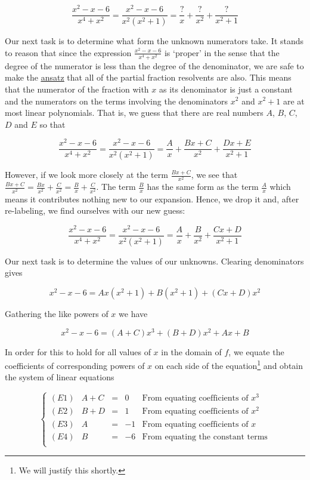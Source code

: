 \[ \dfrac{x^2-x-6}{x^4+x^2} =  \dfrac{x^2-x-6}{x^2 \left(x^2+1\right)} = \dfrac{?}{x} + \dfrac{?}{x^2} + \dfrac{?}{x^2+1} \]

Our next task is to determine what form the unknown numerators take. It stands to reason that since the expression $\frac{x^2-x-6}{x^4+x^2}$ is `proper' in the sense that the degree of the numerator is less than the degree of the denominator, we are safe to make the \href{http://en.wikipedia.org/wiki/Ansatz}{\underline{ansatz}} that all of the partial fraction resolvents are also.  This means that the numerator of the fraction with $x$ as its denominator is just a constant and the numerators on the terms involving the denominators $x^2$ and $x^2+1$ are at most linear polynomials.  That is, we guess that there are real numbers $A$, $B$, $C$, $D$ and $E$ so that

\[ \dfrac{x^2-x-6}{x^4+x^2} =  \dfrac{x^2-x-6}{x^2 \left(x^2+1\right)} = \dfrac{A}{x} + \dfrac{Bx+C}{x^2} + \dfrac{Dx+E}{x^2+1} \]

However, if we look more closely at the term $\frac{Bx+C}{x^2}$, we see that $\frac{Bx+C}{x^2} = \frac{Bx}{x^2} + \frac{C}{x^2} = \frac{B}{x} + \frac{C}{x^2}$. The term $\frac{B}{x}$ has the same form as the term $\frac{A}{x}$ which means it contributes nothing new to our expansion.  Hence, we drop it and, after re-labeling, we find ourselves with our new guess:

\[ \dfrac{x^2-x-6}{x^4+x^2} =  \dfrac{x^2-x-6}{x^2 \left(x^2+1\right)} = \dfrac{A}{x} + \dfrac{B}{x^2} + \dfrac{Cx+D}{x^2+1} \] 

Our next task is to determine the values of our unknowns. Clearing denominators gives

\[x^2 - x- 6 = Ax\left(x^2+1\right) + B\left(x^2+1\right) + (Cx+D)x^2 \]

Gathering the like powers of $x$ we have

\[x^2 - x - 6 = (A+C)x^3+(B+D)x^2+Ax + B \]

In order for this to hold for all values of $x$ in the domain of $f$, we equate the coefficients of corresponding powers of $x$ on each side of the equation\footnote{We will justify this shortly.} and obtain the system of linear equations

\[ \left\{ \begin{array}{lrcrl} 
(E1) & A+C & = & 0 & \text{From equating coefficients of $x^{3}$} \\
(E2) & B+D & = & 1 & \text{From equating coefficients of $x^{2}$} \\
(E3) & A & = & -1 & \text{From equating coefficients of $x$} \\
(E4) & B & = & -6 & \text{From equating the constant terms} \\
\end{array} \right. \]

